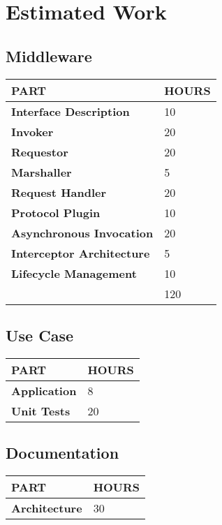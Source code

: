 \documentclass[a4paper]{article}
\begin{document}
\pagestyle{empty}
\section*{Estimated Work}
\vspace{0.5cm}
\subsection*{Middleware}

\begin{small}
\begin{tabular}{| p{4cm} | p{9cm} |}\hline
\textbf{PART} & \textbf{HOURS}\\\hline\hline
\textbf{Interface Description} & 10\\\hline
\textbf{Invoker} & 20\\\hline
\textbf{Requestor} & 20\\\hline
\textbf{Marshaller} & 5\\\hline
\textbf{Request Handler} & 20\\\hline
\textbf{Protocol Plugin} & 10\\\hline
\textbf{Asynchronous Invocation} & 20\\\hline
\textbf{Interceptor Architecture} & 5\\\hline
\textbf{Lifecycle Management} & 10\\\hline\hline
 & 120\\\hline
\end{tabular}
\end{small}

\vspace{1cm}

\subsection*{Use Case}

\begin{small}
\begin{tabular}{| p{4cm} | p{9cm} |}\hline
\textbf{PART} & \textbf{HOURS}\\\hline\hline
\textbf{Application} & 8\\\hline
\textbf{Unit Tests} & 20\\\hline
\end{tabular}
\end{small}


\vspace{1cm}

\subsection*{Documentation}

\begin{small}
\begin{tabular}{| p{4cm} | p{9cm} |}\hline
\textbf{PART} & \textbf{HOURS}\\\hline\hline
\textbf{Architecture} & 30\\\hline
\end{tabular}
\end{small}
\end{document}
